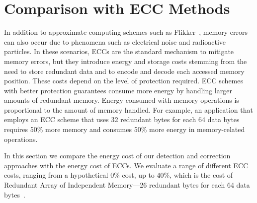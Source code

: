 \documentclass[letterpaper]{article}
\begin{document}
\section{Comparison with ECC Methods}

In addition to approximate computing schemes such as Flikker~\cite{Liu:2011:FSD:1950365.1950391}, memory errors can also occur due to phenomena such as electrical noise and radioactive particles. %
In these scenarios, ECCs are the standard mechanism to mitigate memory errors, but they introduce energy and storage costs stemming from the need to store redundant data and to encode and decode each accessed memory position. These costs depend on the level of protection required. ECC schemes with better protection guarantees consume more energy by handling larger amounts of redundant memory. Energy consumed with memory operations is proportional to the amount of memory handled. For example, an application that employs an ECC scheme that uses 32 redundant bytes for each 64 data bytes requires 50\% more memory and consumes 50\% more energy in memory-related operations. 



In this section we compare the energy cost of our detection and correction approaches with the energy cost of ECCs.  
We evaluate a range of different ECC costs, ranging from a hypothetical 0\% cost, up to 40\%, which is the cost of Redundant Array of Independent Memory---26 redundant bytes for each 64 data bytes~\cite{6136239}. %
\end{document}
